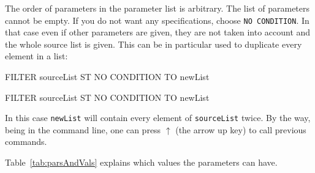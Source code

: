 The order of parameters in the parameter list is arbitrary. The list
of parameters cannot be empty. If you do not want any specifications,
choose \texttt{NO CONDITION}. In that case even if other parameters
are given, they are not taken into account and the whole source list
is given. This can be in particular used to duplicate every element in
a list:

\begin{tcolorbox}
  FILTER sourceList ST NO CONDITION TO newList

  FILTER sourceList ST NO CONDITION TO newList
\end{tcolorbox}

In this case \texttt{newList} will contain every element of
\texttt{sourceList} twice. By the way, being in the command line, one
can press $\uparrow$ (the arrow up key) to call previous commands.

Table~\ref{tab:parsAndVals} explains which values the parameters can have.


